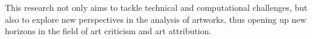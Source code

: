 \noindent This research not only aims to tackle technical and computational challenges, but also to explore new perspectives in the analysis of artworks, thus opening up new horizons in the field of art criticism and art attribution.









%
